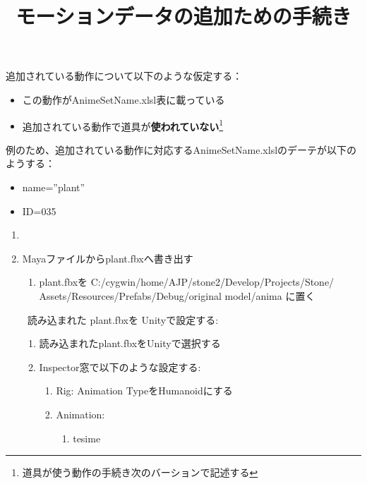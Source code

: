 \documentclass[a4paper]{report}
\title{モーションデータの追加ための手続き}
\newcommand{\tname}{{\ttfamily AnimeSetName.xlsl}}
\newcommand{\fbxname}{\ttfamily plant.fbx}
\begin{document}
\maketitle
追加されている動作について以下のような仮定する：
\begin{itemize}
	\item この動作が{\ttfamily AnimeSetName.xlsl}表に載っている
	\item 追加されている動作で道具が\textbf{使われていない}\footnote{道具が使う動作の手続き次のバーションで記述する}
\end{itemize}
例のため、追加されている動作に対応する\tname のデーテが以下のようする：
\begin{itemize}
	\item {\ttfamily name=''plant''}
	\item {\ttfamily ID=035}
\end{itemize}
\begin{enumerate}
	\item 
	\item Mayaファイルから{\ttfamily plant.fbx}へ書き出す\begin{enumerate}
			\item \fbxname を {\ttfamily 
				C:/cygwin/home/AJP/stone2/Develop/Projects/Stone/}\\{\ttfamily Assets/Resources/Prefabs/Debug/original model/anima
				}に置く
		\end{enumerate}
	\ 読み込まれた \fbxname を Unityで設定する:
	\begin{enumerate}
		\item 読み込まれた\fbxname をUnityで選択する
		\item Inspector窓で以下のような設定する:
			\begin{enumerate}
				\item Rig: Animation TypeをHumanoidにする
				\item Animation:
					\begin{enumerate}
						\item tesime
					\end{enumerate}
			\end{enumerate}
	\end{enumerate}
\end{enumerate}
\end{document}
